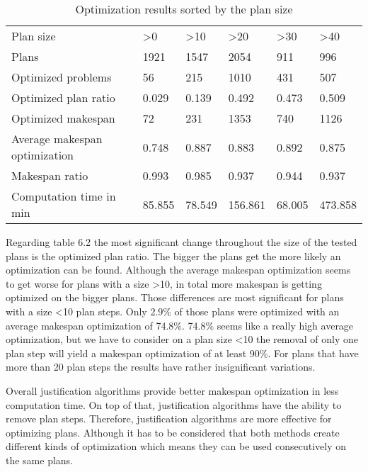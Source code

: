 \begin{table}
    \begin{tabular}{llllll}
    \cline{1-6}
    Plan size                    & \textgreater{}0 & \textgreater{}10 & \textgreater{}20 & \textgreater{}30 & \textgreater{}40 \\ \cline{1-6}
    Plans                         & 1921            & 1547             & 2054             & 911              & 996              \\
    Optimized problems            & 56              & 215              & 1010             & 431              & 507              \\
    Optimized plan ratio          & 0.029           & 0.139            & 0.492            & 0.473            & 0.509            \\
    Optimized makespan            & 72              & 231              & 1353             & 740              & 1126             \\
    Average makespan optimization & 0.748           & 0.887            & 0.883            & 0.892            & 0.875            \\
    Makespan ratio                & 0.993           & 0.985            & 0.937            & 0.944            & 0.937            \\
    Computation time in min       & 85.855          & 78.549           & 156.861          & 68.005           & 473.858         
    \end{tabular}
    \caption{Optimization results sorted by the plan size}
\end{table}

Regarding table 6.2 the most significant change throughout the size of the tested plans is the optimized plan ratio. 
The bigger the plans get the more likely an optimization can be found.
Although the average makespan optimization seems to get worse for plans with a size \textgreater{}10, in total more makespan is getting optimized on the bigger plans. 
Those differences are most significant for plans with a size \textless{}10 plan steps.
Only 2.9$\%$ of those plans were optimized with an average makespan optimization of 74.8$\%$.
74.8$\%$ seems like a really high average optimization, but we have to consider on a plan size \textless{}10 the removal of only one plan step 
will yield a makespan optimization of at least 90$\%$. 
For plans that have more than 20 plan steps the results have rather insignificant variations. 

Overall justification algorithms provide better makespan optimization in less computation time.
On top of that, justification algorithms have the ability to remove plan steps.
Therefore, justification algorithms are more effective for optimizing plans.
Although it has to be considered that both methods create different kinds of optimization
which means they can be used consecutively on the same plans. 